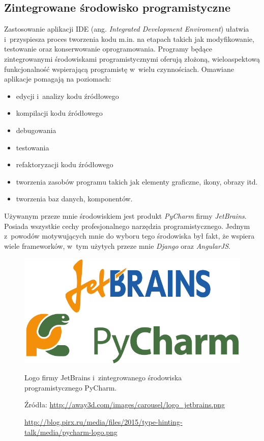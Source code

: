 \documentclass[a4paper,12pt,oneside]{mwrep}  %
\begin{document}
\subsection{Zintegrowane środowisko programistyczne}
Zastosowanie aplikacji IDE (ang. \emph{Integrated Development Enviroment}) ułatwia i~przyspiesza proces tworzenia kodu m.in. na etapach takich jak modyfikowanie, testowanie oraz konserwowanie oprogramowania. Programy będące zintegrowanymi środowiskami programistycznymi oferują złożoną, wieloaspektową funkcjonalność wspierającą programistę w~wielu czynnościach. Omawiane aplikacje pomagają na poziomach:
\begin{itemize}
\item edycji i~analizy kodu źródłowego
\item kompilacji kodu źródłowego
\item debugowania
\item testowania
\item refaktoryzacji kodu źródłowego
\item tworzenia zasobów programu takich jak elementy graficzne, ikony, obrazy itd.
\item tworzenia baz danych, komponentów.
\end{itemize}

Używanym przeze mnie środowiskiem jest produkt \emph{PyCharm} firmy \emph{JetBrains}. Posiada wszystkie cechy profesjonalnego narzędzia programistycznego. Jednym z~powodów motywujących mnie do wyboru tego środowiska był fakt, że wspiera wiele frameworków, w~tym użytych przeze mnie \emph{Django} oraz \emph{AngularJS}. %
\begin{figure}[h]
\centering
\includegraphics[width=1\textwidth/2]{grafika/loga/jetbrains_pycharm_pionowo.png}
\caption{Logo firmy JetBrains i~zintegrowanego środowiska programistycznego PyCharm.}
\vspace{-0.8cm}
\caption*{\scriptsize \hspace{-5.2cm} Źródła: \url{http://away3d.com/images/carousel/logo_jetbrains.png}}
\vspace{-0.8cm}
\caption*{\scriptsize \url{http://blog.pirx.ru/media/files/2015/type-hinting-talk/media/pycharm-logo.png}}
\label{logo_jetbrains_pycharm}
\end{figure}
\end{document}
